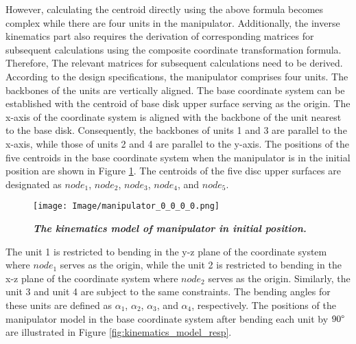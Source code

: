 However, calculating the centroid directly using the above formula becomes complex while there are four units in the manipulator. 
Additionally, the inverse kinematics part also requires the derivation of corresponding matrices for subsequent calculations 
using the composite coordinate transformation formula. Therefore, The relevant matrices for subsequent calculations need to 
be derived. \\
According to the design specifications, the manipulator comprises four units. The backbones of the units are vertically aligned. 
The base coordinate system can be established with the centroid of base disk upper surface serving as the origin. The x-axis of 
the coordinate system is aligned with the backbone of the unit nearest to the base disk. Consequently, the backbones of units 1 
and 3 are parallel to the x-axis, while those of units 2 and 4 are parallel to the y-axis. The positions of the five centroids 
in the base coordinate system when the manipulator is in the initial position are shown in Figure \ref{fig:kinematics model 0_0_0_0}. 
The centroids of the five disc upper surfaces are designated as $node_1$, $node_2$, $node_3$, $node_4$, and $node_5$. \\
\begin{figure}[H] %
    \centering %
    \captionsetup{labelsep=colon}
    \texttt{[image: Image/manipulator\_0\_0\_0\_0.png]} 
    \caption[The kinematics model of manipulator in the initial position]
    {\centering \textit{\textbf{The kinematics model of manipulator in initial position.}}}
    \label{fig:kinematics model 0_0_0_0}
\end{figure}
\noindent The unit 1 is restricted to bending in the y-z plane of the coordinate system where $node_1$ serves as the origin, while the unit 2 
is restricted to bending in the x-z plane of the coordinate system where $node_2$ serves as the origin. Similarly, the unit 3 and 
unit 4 are subject to the same constraints. The bending angles for these units are defined as $\alpha_1$, $\alpha_2$, $\alpha_3$, 
and $\alpha_4$, respectively. The positions of the manipulator model in the base coordinate system after bending each unit by 
$90 \degree$ are illustrated in Figure \ref{fig:kinematics_model_resp}.
